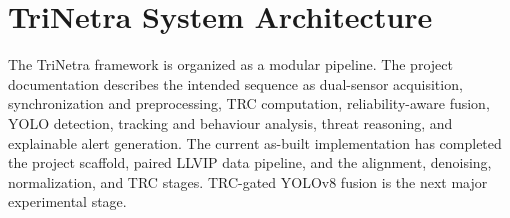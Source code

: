 \documentclass[conference]{IEEEtran}
\begin{document}

\section{TriNetra System Architecture}

The TriNetra framework is organized as a modular pipeline. The project documentation describes the intended sequence as dual-sensor acquisition, synchronization and preprocessing, TRC computation, reliability-aware fusion, YOLO detection, tracking and behaviour analysis, threat reasoning, and explainable alert generation. The current as-built implementation has completed the project scaffold, paired LLVIP data pipeline, and the alignment, denoising, normalization, and TRC stages. TRC-gated YOLOv8 fusion is the next major experimental stage.
\end{document}
